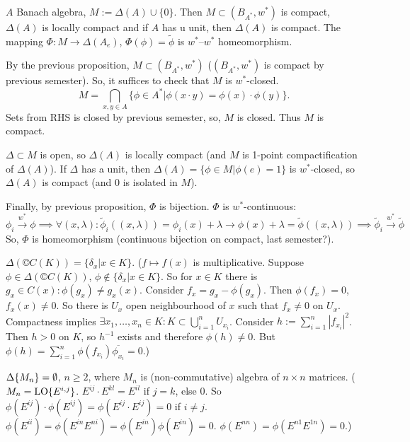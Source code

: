 \documentclass[12pt]{article}					%
\begin{document}
\begin{veta}
	$A$ Banach algebra, $M := \Delta(A) \cup \{0\}$. Then $M \subset (B_{A^*}, w^*)$ is compact, $\Delta(A)$ is locally compact and if $A$ has u unit, then $\Delta(A)$ is compact. The mapping $\Phi: M \rightarrow \Delta(A_e)$, $\Phi(\phi) = \tilde \phi$ is $w^*$–$w^*$ homeomorphism.

	\begin{dukazin}
		By the previous proposition, $M \subset (B_{A^*}, w^*)$ ($(B_{A^*}, w^*)$ is compact by previous semester). So, it suffices to check that $M$ is $w^*$-closed.
		$$ M = \bigcap_{x, y \in A} \{\phi \in A^* | \phi(x·y) = \phi(x)·\phi(y)\}. $$
		Sets from RHS is closed by previous semester, so, $M$ is closed. Thus $M$ is compact.

		$\Delta \subset M$ is open, so $\Delta(A)$ is locally compact (and $M$ is 1-point compactification of $\Delta(A)$). If $\Delta$ has a unit, then $\Delta(A) = \{\phi \in M | \phi(e) = 1\}$ is $w^*$-closed, so $\Delta(A)$ is compact (and $0$ is isolated in $M$).

		Finally, by previous proposition, $\Phi$ is bijection. $\Phi$ is $w^*$-continuous:
		$$ \phi_i \overset{w^*}\rightarrow \phi \implies \forall (x, \lambda): \tilde\phi_i((x, \lambda)) = \phi_i(x) + \lambda \rightarrow \phi(x) + \lambda = \tilde \phi((x, \lambda)) \implies \tilde\phi_i \overset{w^*}\rightarrow \tilde\phi $$
		So, $\Phi$ is homeomorphism (continuous bijection on compact, last semester?).
	\end{dukazin}
\end{veta}

\begin{priklady}
	$\Delta(©C(K)) = \{\delta_x | x \in K\}$. ($f \mapsto f(x)$ is multiplicative. Suppose $\phi \in \Delta(©C(K))$, $\phi \notin \{\delta_x | x \in K\}$. So for $x \in K$ there is $g_x \in C(x): \phi(g_x) ≠ g_x(x)$. Consider $f_x = g_x - \phi(g_x)$. Then $\phi(f_x) = 0$, $f_x(x) ≠ 0$. So there is $U_x$ open neighbourhood of $x$ such that $f_x ≠ 0$ on $U_x$. Compactness implies $\exists x_1, …, x_n \in K: K \subset \bigcup_{i=1}^n U_{x_i}$. Consider $h := \sum_{i=1}^n |f_{x_i}|^2$. Then $h > 0$ on $K$, so $h^{-1}$ exists and therefore $\phi(h) ≠ 0$. But $\phi(h) = \sum_{i=1}^n \phi(f_{x_i}) \overline{\phi_{x_i}} = 0$.)

	$\Delta \{M_n\} = \emptyset$, $n ≥ 2$, where $M_n$ is (non-commutative) algebra of $n\times n$ matrices. ($M_n = \operatorname{LO} \{E^{i, j}\}$. $E^{ij}·E^{kl} = E^{il}$ if $j = k$, else $0$. So $\phi(E^{ij})·\phi(E^{ij}) = \phi(E^{ij}·E^{ij}) = 0$ if $i ≠ j$. $\phi(E^{ii}) = \phi(E^{in}E^{ni}) = \phi(E^{in})\phi(E^{in}) = 0$. $\phi(E^{nn}) = \phi(E^{n1}E^{1n}) = 0$.)
\end{priklady}
\end{document}
